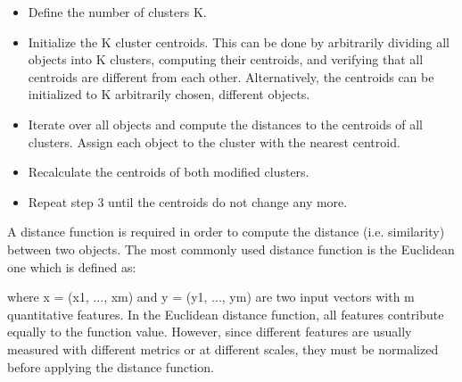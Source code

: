 \begin{itemize}
	\item Define the number of clusters K.
	
	\item Initialize the K cluster centroids. This can be done by arbitrarily dividing all objects into K clusters, computing their centroids, and verifying that all centroids are different from each other. Alternatively, the centroids can be initialized to K arbitrarily chosen, different objects.
	
	\item Iterate over all objects and compute the distances to the centroids of all clusters. Assign each object to the cluster with the nearest centroid.
	
	\item Recalculate the centroids of both modified clusters.
	
	\item Repeat step 3 until the centroids do not change any more.
\end{itemize}

A distance function is required in order to compute the
distance (i.e. similarity) between two objects. The most commonly used distance function is the Euclidean one which is defined as:

\begin{center}
\end{center}

where x = (x1, ..., xm) and y = (y1, ..., ym) are two input vectors with m quantitative features. In the Euclidean distance function, all features contribute equally to the function value. However, since different features are usually measured with different metrics or at different scales, they must be normalized
before applying the distance function.